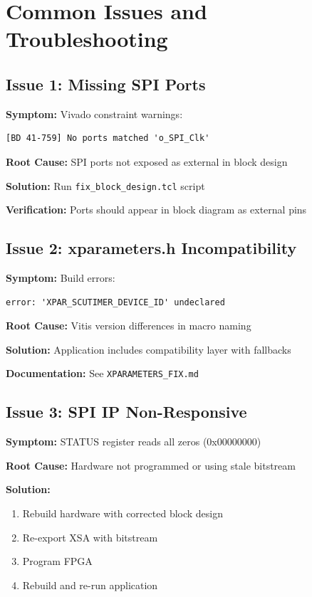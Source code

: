 \documentclass[11pt,a4paper]{article}
\begin{document}
\section{Common Issues and Troubleshooting}

\subsection{Issue 1: Missing SPI Ports}

\textbf{Symptom:} Vivado constraint warnings:
\begin{verbatim}
[BD 41-759] No ports matched 'o_SPI_Clk'
\end{verbatim}

\textbf{Root Cause:} SPI ports not exposed as external in block design

\textbf{Solution:} Run \texttt{fix\_block\_design.tcl} script

\textbf{Verification:} Ports should appear in block diagram as external pins

\subsection{Issue 2: xparameters.h Incompatibility}

\textbf{Symptom:} Build errors:
\begin{verbatim}
error: 'XPAR_SCUTIMER_DEVICE_ID' undeclared
\end{verbatim}

\textbf{Root Cause:} Vitis version differences in macro naming

\textbf{Solution:} Application includes compatibility layer with fallbacks

\textbf{Documentation:} See \texttt{XPARAMETERS\_FIX.md}

\subsection{Issue 3: SPI IP Non-Responsive}

\textbf{Symptom:} STATUS register reads all zeros (0x00000000)

\textbf{Root Cause:} Hardware not programmed or using stale bitstream

\textbf{Solution:}
\begin{enumerate}
    \item Rebuild hardware with corrected block design
    \item Re-export XSA with bitstream
    \item Program FPGA
    \item Rebuild and re-run application
\end{enumerate}
\end{document}

